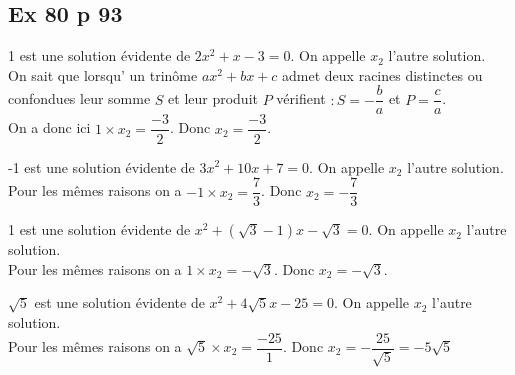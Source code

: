 \documentclass[12pt,a4paper]{book}
\begin{document}





 \subsection*{Ex 80 p 93}

 \begin{enumMet}
     \item 1 est une solution évidente de $2 x^{2}+x-3=0 .$ On appelle $x_{2}$ l'autre solution.\\
    
     On sait que lorsqu' un trinôme $a x^{2}+b x+c$ admet deux racines distinctes ou confondues leur somme $S$ et leur produit $P$ vérifient $: S=-\dfrac{b}{a}$ et $P=\dfrac{c}{a}$.\\
    
     On a donc ici $1 \times x_{2}=\dfrac{-3}{2}$. Donc $x_{2}=\dfrac{-3}{2}$.
     \item -1 est une solution évidente de $3 x^{2}+10 x+7=0 .$ On appelle $x_{2}$ l'autre solution. \\
    
     Pour les mêmes raisons on a $-1 \times x_{2}=\dfrac{7}{3}$. Donc $x_{2}=-\dfrac{7}{3}$
     \item 1 est une solution évidente de $x^{2}+(\sqrt{3}-1) x-\sqrt{3}=0 .$ On appelle $x_{2}$ l'autre solution.\\
    
     Pour les mêmes raisons on a $1 \times x_{2}=-\sqrt{3}$. Donc $x_{2}=-\sqrt{3}$.
     \item $\sqrt{5}$ est une solution évidente de $x^{2}+4 \sqrt{5} x-25=0 .$ On appelle $x_{2}$ l'autre solution.\\
    
     Pour les mêmes raisons on a $\sqrt{5} \times x_{2}=\dfrac{-25}{1}$. Donc $x_{2}=-\dfrac{25}{\sqrt{5}}=-5 \sqrt{5}$
 \end{enumMet}


\end{document}
